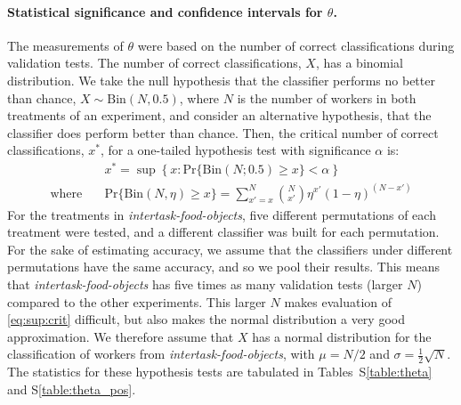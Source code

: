 \documentclass{sigchi}
\begin{document}
\paragraph{Statistical significance and confidence intervals for $\theta$.}
The measurements of $\theta$ were based on the number of correct 
classifications during validation tests.  The number of correct 
classifications, $X$, has a binomial distribution.  
We take the null hypothesis that the classifier performs
no better than chance, $X \sim \mathrm{Bin}(N,0.5)$, where $N$ is the number 
of workers in both treatments of an experiment, and consider an alternative
hypothesis, that the classifier does perform better than chance.  Then, the 
critical number 
of correct classifications, $x^*$, for a one-tailed hypothesis test with
significance $\alpha$ is:
\begin{align}
	&x^* = \sup \left\{
			x: \mathrm{Pr}\{ \mathrm{Bin}(N;0.5) \geq x \} < \alpha
		\right\} \label{eq:sup:crit}\\
	\text{where}\quad &\mathrm{Pr}\{ \mathrm{Bin}(N,\eta) \geq x \} = 
		\sum_{x'=x}^{N} \binom{N}{x'}\eta^{x'}(1-\eta)^{(N-x')}
\end{align}
For the treatments in \textit{intertask-food-objects}, five different 
permutations of each treatment were tested, and a different classifier was 
built for each permutation.  For the sake of estimating accuracy, we assume
that the classifiers under different permutations have the same accuracy,
and so we pool their results.  This means that 
\textit{intertask-food-objects} has five times as many validation tests
(larger $N$) compared to the other experiments.  This larger $N$ makes 
evaluation of \ref{eq:sup:crit} difficult, but also makes the normal 
distribution a very good approximation.  We therefore assume 
that $X$ has a normal distribution for the classification of workers from
\textit{intertask-food-objects}, with $\mu=N/2$ and 
$\sigma = \frac{1}{2}\sqrt{N}$.  The statistics for these hypothesis tests
are tabulated in Tables~S\ref{table:theta} and S\ref{table:theta_pos}.
\end{document}
